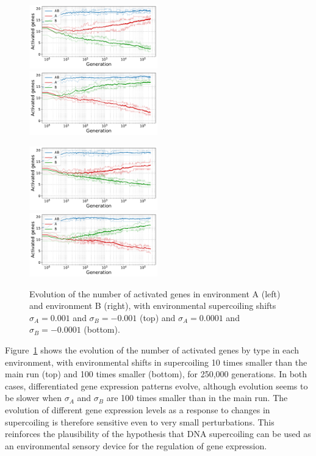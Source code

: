 \begin{figure}[H]
\centering
\includegraphics[width=0.495\textwidth]{param/sigma/sigma-1e-3/gene_activity_env_A.pdf}
\includegraphics[width=0.495\textwidth]{param/sigma/sigma-1e-3/gene_activity_env_B.pdf}

\includegraphics[width=0.495\textwidth]{param/sigma/sigma-1e-4/gene_activity_env_A.pdf}
\includegraphics[width=0.495\textwidth]{param/sigma/sigma-1e-4/gene_activity_env_B.pdf}
\caption[Evolution of the number of activated genes in each environment, with decreasing environmental supercoiling shifts]{Evolution of the number of activated genes in environment A (left) and environment B (right), with environmental supercoiling shifts $\sigma_A = 0.001$ and $\sigma_B = -0.001$ (top) and $\sigma_A = 0.0001$ and $\sigma_B = -0.0001$ (bottom).}
\label{fig:param:sigma-activ-by-env}
\end{figure}

Figure~\ref{fig:param:sigma-activ-by-env} shows the evolution of the number of activated genes by type in each environment, with environmental shifts in supercoiling 10 times smaller than the main run (top) and 100 times smaller (bottom), for 250,000 generations.
In both cases, differentiated gene expression patterns evolve, although evolution seems to be slower when $\sigma_A$ and $\sigma_B$ are 100 times smaller than in the main run.
The evolution of different gene expression levels as a response to changes in supercoiling is therefore sensitive even to very small perturbations.
This reinforces the plausibility of the hypothesis that DNA supercoiling can be used as an environmental sensory device for the regulation of gene expression.

